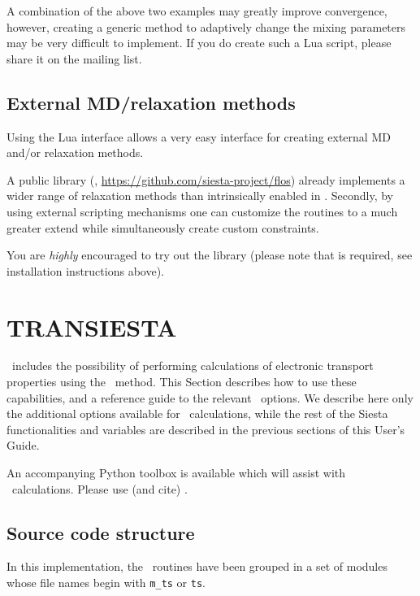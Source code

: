 A combination of the above two examples may greatly improve
convergence, however, creating a generic method to adaptively change
the mixing parameters may be very difficult to implement. If you do
create such a Lua script, please share it on the mailing list.


\subsection{External MD/relaxation methods}

Using the Lua interface allows a very easy interface for creating
external MD and/or relaxation methods.

A public library (,
\url{https://github.com/siesta-project/flos}) already implements a
wider range of relaxation methods than intrinsically enabled in
\siesta. Secondly, by using external scripting mechanisms one can
customize the routines to a much greater extend while simultaneously
create custom constraints.

You are \emph{highly} encouraged to try out the  library
(please note that  is required, see installation
instructions above).



\section{TRANSIESTA}
\label{sec:transiesta}

\newcommand\Nelec{N_{\mathfrak{E}}}


\siesta\ includes the possibility of performing calculations of
electronic transport properties using the \tsiesta\ method. This
Section describes how to use these
capabilities, and a reference guide to the relevant \fdflib\
options. We describe here only the additional options available for
\tsiesta\ calculations, while the rest of the Siesta functionalities
and variables are described in the previous sections of this User's
Guide.

An accompanying Python toolbox is available which will assist with
\tsiesta\ calculations. Please use (and cite) \sisl\cite{sisl}.


\subsection{Source code structure}

In this implementation, the \tsiesta\ routines have been grouped in a
set of modules whose file names begin with \texttt{m\_ts} or
\texttt{ts}.

